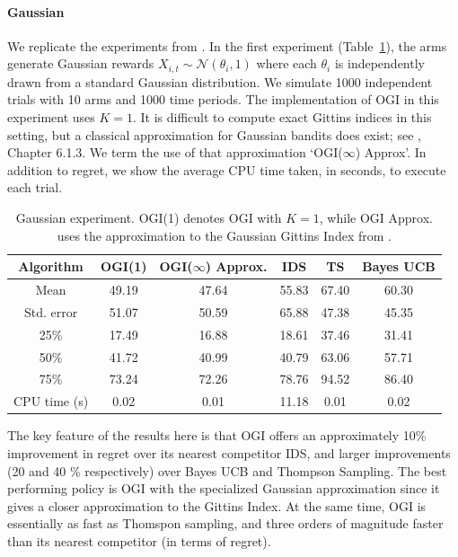 \paragraph{Gaussian}We replicate the experiments from \cite{russo2014learning}. In the first experiment (Table~\ref{table:gaussian_experiment1}), the arms generate Gaussian rewards  $X_{i,t} \sim \mathcal{N}(\theta_i, 1)$ where each $\theta_i$ is independently drawn from a standard Gaussian distribution. We simulate 1000 independent trials with 10 arms and 1000 time periods. The implementation of OGI in this experiment uses $K = 1$. It is difficult to compute exact Gittins indices in this setting, but a classical approximation for Gaussian bandits does exist; see \cite{powell2012optimal}, Chapter 6.1.3. We term the use of that approximation `OGI($\infty$) Approx'.  In addition to regret, we  show the average CPU time taken, in seconds, to execute each trial.

\begin{table}[h!]
	\centering
	\begin{tabular}{cccccc} \toprule
		\textbf{Algorithm}  & \textbf{OGI(1)} & \textbf{OGI($\infty$) Approx.} & \textbf{IDS} & \textbf{TS} & \textbf{Bayes UCB}\\ \midrule
		Mean   & 49.19 & 47.64  &  55.83 & 67.40 & 60.30  \\ 
		Std. error  & 51.07 & 50.59 & 65.88 & 47.38 & 45.35 \\ 
		25\%  & 17.49 & 16.88  & 18.61 & 37.46 & 31.41 \\
		50\%   & 41.72 & 40.99 & 40.79 & 63.06 & 57.71 \\ 
		75\%  & 73.24 & 72.26 & 78.76 & 94.52 & 86.40 \\ 
		CPU time (s) & 0.02 & 0.01 & 11.18 & 0.01 & 0.02 \\
		\bottomrule
	\end{tabular}
	\caption[Table caption text]{Gaussian experiment. OGI(1) denotes OGI with $K =1$, while OGI Approx. uses the approximation to the Gaussian Gittins Index from \cite{powell2012optimal}.}
	\label{table:gaussian_experiment1}
\end{table}

The key feature of the results here is that OGI offers an approximately 10\% improvement in regret over its nearest competitor IDS, and larger improvements (20 and 40 \% respectively) over Bayes UCB and Thompson Sampling. The best performing policy is OGI with the specialized Gaussian approximation since it gives a closer approximation to the Gittins Index. At the same time, OGI is essentially as fast as Thomspon sampling, and three orders of magnitude faster than its nearest competitor (in terms of regret). 


